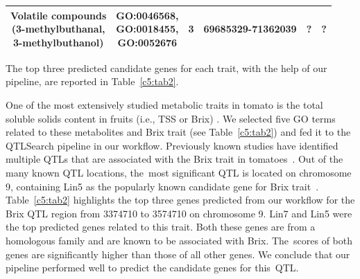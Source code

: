 \documentclass[applsci,article,accept,moreauthors,pdftex]{Definitions/mdpi}
\begin{document}
{\begin{table}[H]
{{{\begin{tabular}{c  c  c  c  c  c }
\midrule
\makecell{Volatile compounds\\ (3-methylbuthanal, \\3-methylbuthanol)} & \makecell{GO:0046568, \\ GO:0018455, \\ GO:0052676} & 3 & 69685329-71362039 & ? & ?\\ %
\bottomrule
\end{tabular}}
}
}
\end{table}
The top three %
predicted candidate genes for each trait, with the help of our pipeline, %
are reported in Table~\ref{c5:tab2}. 

One of the most extensively studied metabolic traits in tomato is the total soluble solids content in fruits (i.e., TSS or Brix) \cite{fridman2002two}.
We selected five %
GO terms related to these metabolites and Brix trait (see Table~\ref{c5:tab2}) and fed it to the QTLSearch pipeline in our workflow. Previously known studies have identified multiple QTLs that are associated with the Brix trait in tomatoes~\cite{haggard2015multiple}. Out of the many known QTL locations, the~most significant QTL is located on chromosome 9, containing Lin5 as the popularly known candidate gene for Brix trait~\cite{fridman2002two}.
Table~\ref{c5:tab2} highlights the top three genes %
predicted from our workflow for the Brix QTL region from 3374710 to 3574710 on chromosome 9. %
Lin7 and Lin5 were the top predicted genes related to this trait. Both these genes are from a homologous family and are known to be associated with Brix.
The~scores of both genes are %
significantly higher than those of all other genes. We conclude that our pipeline performed well to predict the candidate genes for this~QTL. 

}
\end{document}

